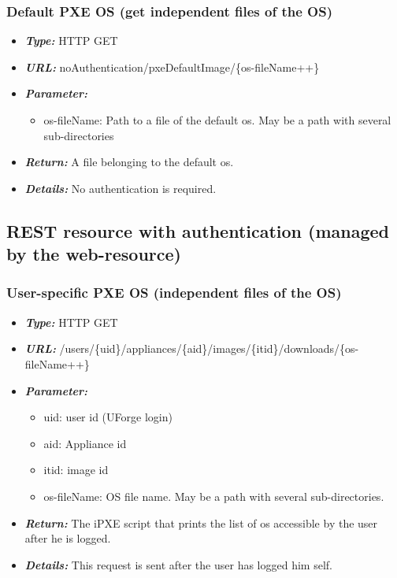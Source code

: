 \documentclass[12pt]{article}											%
\begin{document}
		\subsubsection{Default PXE OS (get independent files of the OS)} \label{resource_noAuthentication_defaultImage}
			\begin{itemize}
				\item \textbf{\textit{Type:}} HTTP GET
				\item \textbf{\textit{URL:}} noAuthentication/pxeDefaultImage/\{os-fileName++\}
				\item \textbf{\textit{Parameter:}}
					\begin{itemize}
						\item os-fileName: Path to a file of the default os.  May be a path with several sub-directories
					\end{itemize}
				\item \textbf{\textit{Return:}} A file belonging to the default os.
				\item \textbf{\textit{Details:}} No authentication is required.
			\end{itemize}



	\subsection{REST resource with authentication (managed by the web-resource)}
		\subsubsection{User-specific PXE OS (independent files of the OS)} \label{userSpecificImagePxeScript}
			\begin{itemize}
				\item \textbf{\textit{Type:}} HTTP GET
				\item \textbf{\textit{URL:}} /users/\{uid\}/appliances/\{aid\}/images/\{itid\}/downloads/\{os-fileName++\}
				\item \textbf{\textit{Parameter:}}
					\begin{itemize}
						\item uid: user id (UForge login)
						\item aid: Appliance id
                        \item itid: image id
                        \item os-fileName: OS file name.   May be a path with several sub-directories.
					\end{itemize}
				\item \textbf{\textit{Return:}} The iPXE script that prints the list of os accessible by the user after he is logged.
				\item \textbf{\textit{Details:}} This request is sent after the user has logged him self.   
			\end{itemize}
\end{document}
